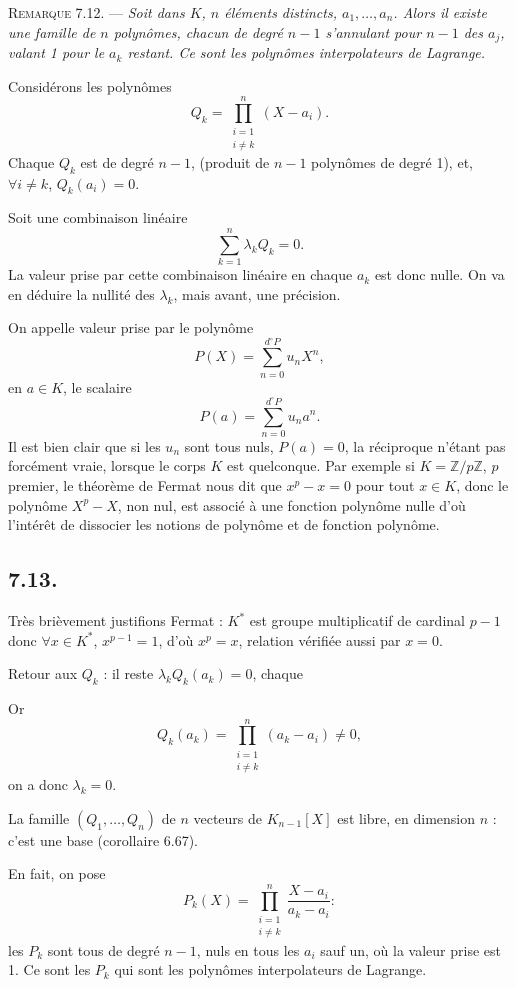 \medskip\noindent\textsc{Remarque 7.12.} --- \emph{Soit dans $K$, $n$ éléments distincts, $a_1,\ldots,a_n$. Alors il existe une famille de $n$ polynômes, chacun de degré $n-1$ s'annulant pour $n-1$ des $a_j$, valant 1 pour le $a_k$ restant. Ce sont les polynômes interpolateurs de Lagrange.}

Considérons les polynômes
\[
Q_k=\prod_{\substack{i=1\\ i\ne k}}^n(X-a_i).
\]
Chaque $Q_k$ est de degré $n-1$, (produit de $n-1$ polynômes de degré 1), et, $\forall i\ne k$, $Q_k(a_i)=0$.

Soit une combinaison linéaire
\[
\sum_{k=1}^n\lambda_kQ_k=0.
\]
La valeur prise par cette combinaison linéaire en chaque $a_k$ est donc nulle. On va en déduire la nullité des $\lambda_k$, mais avant, une précision.

On appelle valeur prise par le polynôme
\[
P(X)=\sum_{n=0}^{d^\circ P}u_nX^n,
\]
en $a\in K$, le scalaire
\[
P(a)=\sum_{n=0}^{d^\circ P}u_na^n.
\]
Il est bien clair que si les $u_n$ sont tous nuls, $P(a)=0$, la réciproque n'étant pas forcément vraie, lorsque le corps $K$ est quelconque. Par exemple si $K=\mathbb Z/p\mathbb Z$, $p$ premier, le théorème de Fermat nous dit que $x^p-x=0$ pour tout $x\in K$, donc le polynôme $X^p-X$, non nul, est associé à une fonction polynôme nulle d'où l'intérêt de dissocier les notions de polynôme et de fonction polynôme.

\subsection*{7.13.}

Très brièvement justifions Fermat : $K^*$ est groupe multiplicatif de cardinal $p-1$ donc $\forall x\in K^*$, $x^{p-1}=1$, d'où $x^p=x$, relation vérifiée aussi par $x=0$.

Retour aux $Q_k$ : il reste $\lambda_kQ_k(a_k)=0$, chaque 

Or
\[
Q_k(a_k)=\prod_{\substack{i=1\\ i\ne k}}^n(a_k-a_i)\ne0,
\]
on a donc $\lambda_k=0$.

La famille $(Q_1,\ldots,Q_n)$ de $n$ vecteurs de $K_{n-1}[X]$ est libre, en dimension $n$ : c'est une base (corollaire 6.67).

En fait, on pose
\[
P_k(X)=\prod_{\substack{i=1\\ i\ne k}}^n\frac{X-a_i}{a_k-a_i} :
\]
les $P_k$ sont tous de degré $n-1$, nuls en tous les $a_i$ sauf un, où la valeur prise est 1. Ce sont les $P_k$ qui sont les polynômes interpolateurs de Lagrange. \bookend

